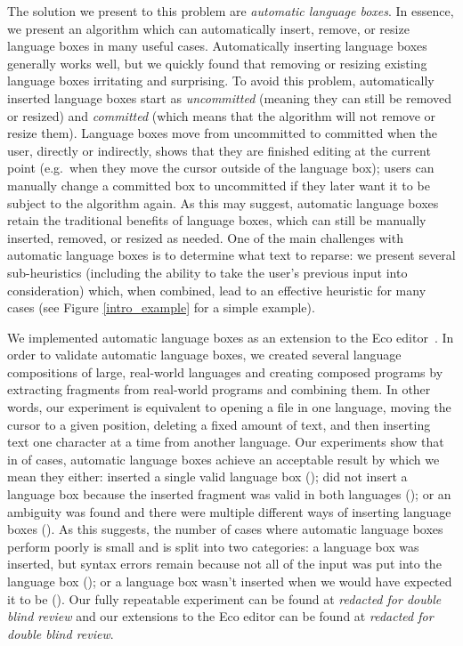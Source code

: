 \documentclass[sigplan,screen]{acmart}\settopmatter{printfolios=true,printccs=false,printacmref=false}
\begin{document}
The solution we present to this problem are \emph{automatic language boxes}. In
essence, we present an algorithm which can automatically insert, remove, or resize language
boxes in many useful cases. Automatically inserting language boxes generally
works well, but we quickly found that removing or resizing existing language boxes
irritating and surprising. To avoid this problem, automatically inserted
language boxes start as \emph{uncommitted} (meaning they can still be
removed or resized) and \emph{committed} (which means that the algorithm will
not remove or resize them). Language boxes
move from uncommitted to committed when the user, directly or indirectly, shows
that they are finished editing at the current point (e.g.~when they move the
cursor outside of the language box); users can manually change a committed box to uncommitted if they later
want it to be subject to the algorithm again. As this may suggest, automatic
language boxes retain the traditional benefits of language boxes, which can still
be manually inserted, removed, or resized as needed. One of the main challenges with
automatic language boxes is to determine what text to reparse: we present
several sub-heuristics (including the ability to take the user's previous input
into consideration) which, when combined, lead to an effective heuristic for
many cases (see Figure \ref{intro_example} for a simple example).

We implemented automatic language boxes as an extension to the Eco
editor~\cite{diekmann14eco}. In order to validate automatic language boxes, we
created several language compositions of large, real-world languages and
creating composed programs by extracting fragments from real-world programs and
combining them. In other words, our experiment is equivalent to opening a file
in one language, moving the cursor to a given position, deleting a fixed amount
of text, and then inserting text one character at a time from another language.
Our experiments show that in \validalloverall of cases, automatic language boxes achieve an
acceptable result by which we mean they either: inserted a single valid
language box (\breakdownallvalid); did not insert a language box because the
inserted fragment was valid in both languages (\breakdownallnovalid); or an ambiguity
was found and there were multiple different ways of inserting language boxes
(\breakdownallnomulti). As this suggests, the number of cases where automatic
language boxes perform poorly is small and is split into two categories: a
language box was inserted, but syntax errors remain because not all of the
input was put into the language box (\breakdownallinvalid); or a language box wasn't
inserted when we would have expected it to be (\breakdownallnoerror). Our fully
repeatable experiment can be found at \emph{redacted for double blind review}
and our extensions to the Eco editor can be found at \emph{redacted for double
blind review}.
\end{document}
